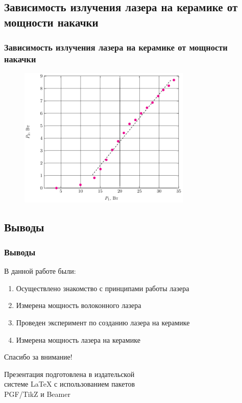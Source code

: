 \documentclass[10pt,pdf,hyperref={unicode}, dvipsnames]{beamer}
\newcommand\frametitless[1]{\subsection{#1}\frametitle{#1}}
\begin{document}
\begin{frame}[t]
	\frametitless{Зависимость излучения лазера на керамике от мощности накачки}
		\begin{figure}[tb]
		\centering
		\includegraphics[width=0.73\textwidth]{img/P2P1}
	\end{figure}
\end{frame}
\begin{frame}
	\frametitless{Выводы}
	В данной работе были:
	\begin{enumerate}
		\item Осуществлено знакомство с принципами работы  лазера
		\item Измерена мощность волоконного лазера
		\item Проведен эксперимент по созданию лазера на керамике
		\item Измерена мощность лазера на керамике
	\end{enumerate}
\end{frame}


\begin{frame}[plain]
	\vspace{4cm}
	\begin{center}
		\Huge
		Спасибо за внимание!
	\end{center}
	\vspace{2.5cm}
	\begin{center}
		\color{black!30!white}
		Презентация подготовлена в издательской \\
		системе LaTeX с использованием пакетов \\
		PGF/TikZ и Beamer
	\end{center}
\end{frame}
\end{document}
